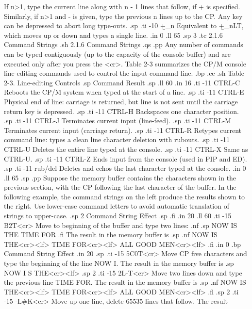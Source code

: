 If n>1, type the current line along with n - 1 lines that follow, if + is
specified.  Similarly, if n>1 and - is given, type the previous n lines up to
the CP.  Any key can be depressed to abort long type-outs.
.sp
.ti -10
+\b_n        Equivalent to +\b_nLT, which moves up or down and types a
single line.
.in 0
.ll 65
.sp 3
.tc         2.1.6  Command Strings
.sh
2.1.6  Command Strings
.qs
.pp
Any number of commands can be typed contiguously (up to the capacity of
the console buffer) and are executed only after you press the <cr>.  Table 2-3
summarizes the CP/M console line-editing commands used to control the input
command line.
.bp
.ce
.sh
Table 2-3.  Line-editing Controls
.sp
     Command                      Result
.sp
.ll 60
.in 16
.ti -11
CTRL-C     Reboots the CP/M system when typed at the start of a line.
.sp
.ti -11
CTRL-E     Physical end of line:  carriage is returned, but line is not sent
until the carriage return key is depressed.
.sp
.ti -11
CTRL-H     Backspaces one character position.
.sp
.ti -11
CTRL-J     Terminates current input (line-feed).
.sp
.ti -11
CTRL-M     Terminates current input (carriage return).
.sp
.ti -11
CTRL-R     Retypes current command line:  types a clean line character
deletion with rubouts.
.sp
.ti -11
CTRL-U     Deletes the entire line typed at the console.
.sp
.ti -11
CTRL-X     Same as CTRL-U.
.sp
.ti -11
CTRL-Z     Ends input from the console (used in PIP and ED).
.sp
.ti -11
rub/del    Deletes and echos the last character typed at the
console.
.in 0
.ll 65
.sp
.pp
Suppose the memory buffer contains the characters shown in the 
previous section, with the CP following the last character of the 
buffer.  In the following example, the command strings on the left produce
the results shown to the right.  Use lower-case command letters to avoid
automatic translation of strings to upper-case.
.sp 2
  Command String                      Effect
.sp
.fi
.in 20
.ll 60
.ti -15
B2T<cr>        Move to beginning of the buffer and type two lines:
.nf
.sp
NOW IS THE
TIME FOR
.fi
The result in the memory buffer is
.sp
.nf
NOW IS THE<cr><lf>
TIME FOR<cr><lf>
ALL GOOD MEN<cr><lf>
.fi
.in 0
.bp
  Command String                      Effect
.in 20
.sp
.ti -15
5C0T<cr>       Move CP five characters and type the beginning of the line NOW
I.  The result in the memory buffer is
.sp
NOW I  S THE<cr><lf>
.sp 2
.ti -15
2L-T<cr>       Move two lines down and type the previous line TIME FOR.
The result in the memory buffer is
.sp
.nf
NOW IS THE<cr><lf>
TIME FOR<cr><lf>
ALL GOOD MEN<cr><lf>
.fi
.sp 2
.ti -15
-L#K<cr>       Move up one line, delete 65535 lines that follow.  The result
